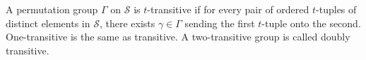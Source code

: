 A permutation group $\Gamma$ on $\mathcal{S}$ is $t$-transitive if for every pair of ordered $t$-tuples of distinct elements in $\mathcal{S}$, there exists $\gamma \in \Gamma$ sending the first $t$-tuple onto the second. One-transitive is the same as transitive. A two-transitive group is called doubly transitive.
